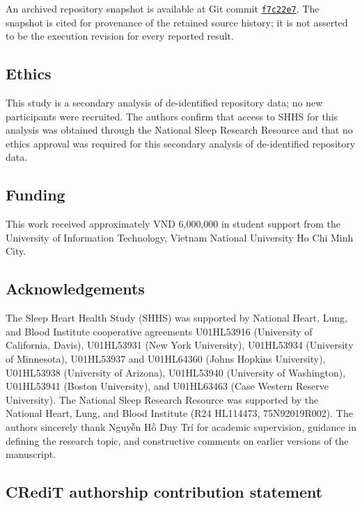 \documentclass[11pt,a4paper]{article}
\begin{document}
An archived repository snapshot is available at Git commit
\href{https://github.com/quanuiter/SleepTCN/commit/f7c22e76022b8e24ac8d1343a39a990d42a1b3e2}{\texttt{f7c22e7}}.
The snapshot is cited for provenance of the retained source history; it is not asserted to be the
execution revision for every reported result.

\subsection*{Ethics}

This study is a secondary analysis of de-identified repository data; no new participants were recruited.
The authors confirm that access to SHHS for this analysis was obtained through the National Sleep
Research Resource and that no ethics approval was required for this secondary analysis of de-identified
repository data.

\subsection*{Funding}

This work received approximately VND 6,000,000 in student support from the University of Information
Technology, Vietnam National University Ho Chi Minh City.

\subsection*{Acknowledgements}
The Sleep Heart Health Study (SHHS) was supported by National Heart, Lung, and Blood Institute
cooperative agreements U01HL53916 (University of California, Davis), U01HL53931 (New York
University), U01HL53934 (University of Minnesota), U01HL53937 and U01HL64360 (Johns Hopkins
University), U01HL53938 (University of Arizona), U01HL53940 (University of Washington), U01HL53941
(Boston University), and U01HL63463 (Case Western Reserve University). The National Sleep Research
Resource was supported by the National Heart, Lung, and Blood Institute (R24 HL114473,
75N92019R002). The authors sincerely thank Nguy\~{\^e}n H\`{\^o} Duy Tr\'i for academic supervision, guidance in
defining the research topic, and constructive comments on earlier versions of the manuscript.

\subsection*{CRediT authorship contribution statement}
\end{document}
